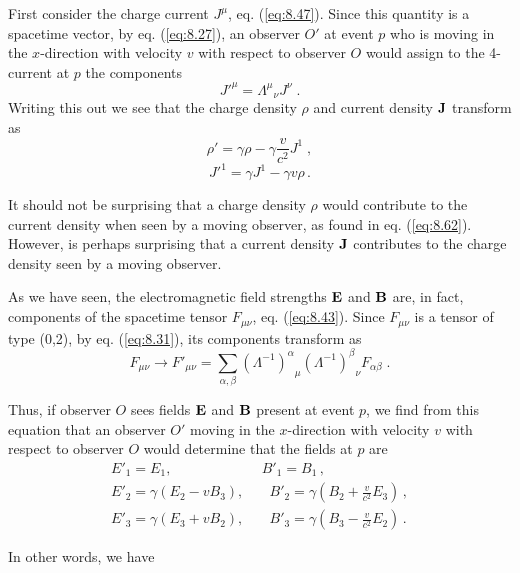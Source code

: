 First consider the charge current $J^\mu$, eq. (\ref{eq:8.47}). Since this quantity is a spacetime vector, by  eq. (\ref{eq:8.27}), an observer $O'$ at event $p$ who is moving in the $x$-direction with velocity $v$ with respect to observer $O$ would assign to the 4-current at $p$ the components
\begin{equation}\label{eq:8.60}
{J'}^\mu = {\Lambda^\mu}_\nu J^\nu\;. 
\end{equation}
Writing this out we see that the charge density $\rho$ and current density $\vb{J}$ transform as
\begin{equation}\label{eq:8.61}
\rho' = \gamma \rho - \gamma \frac{v}{c^2} J^1\;,
\end{equation}
\begin{equation}\label{eq:8.62}
{J'}^1 = \gamma J^1 - \gamma v \rho\,.
\end{equation}

It should not be surprising that a charge density $\rho$ would contribute to the current density when seen by a moving observer, as found in eq. (\ref{eq:8.62}). However, is perhaps surprising that a current density $\vb{J}$ contributes to the charge density seen by a moving observer. 

As we have seen, the electromagnetic field strengths $\vb{E}$ and $\vb{B}$ are, in fact, components of the spacetime tensor $F_{\mu\nu}$, eq. (\ref{eq:8.43}). Since $F_{\mu\nu}$ is a tensor of type (0,2), by eq. (\ref{eq:8.31}), its components transform as
\begin{equation}\label{eq:8.63}
F_{\mu\nu} \rightarrow F'_{\mu\nu} = \sum_{\alpha,\beta} {(\Lambda^{-1})^\alpha}_\mu {(\Lambda^{-1})^\beta}_\nu F_{\alpha\beta}\;. 
\end{equation}

Thus, if observer $O$ sees fields $\vb{E}$ and $\vb{B}$ present at event $p$, we find from this equation that an observer $O'$ moving in the $x$-direction with velocity $v$ with respect to observer $O$ would determine that the fields at $p$ are
\begin{align}
E'_1 = E_1, &\:\: B'_1 = B_1\,,\label{eq:8.64}\\  
E'_2 = \gamma (E_2 - v B_3), &\quad B'_2 = \gamma \left(B_2 + \frac{v}{c^2} E_3 \right)\,,\label{eq:8.65}\\
E'_3 = \gamma (E_3 + v B_2), &\quad B'_3 = \gamma \left(B_3 - \frac{v}{c^2} E_2 \right)\,.\label{eq:8.66}
\end{align}

In other words, we have

